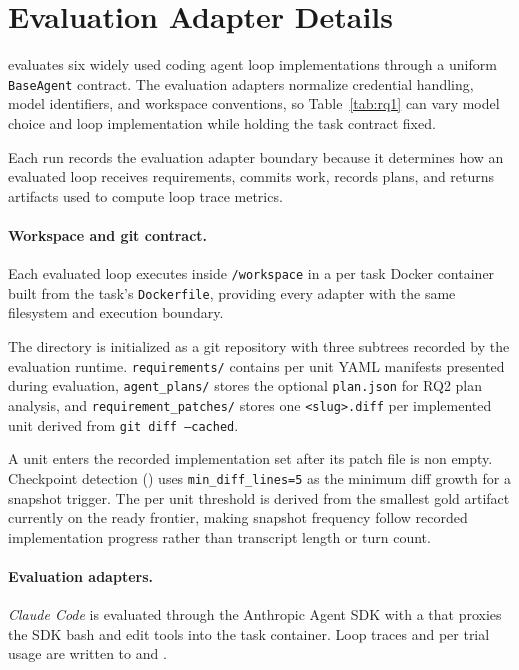 \section{Evaluation Adapter Details}\label{app:adaptations}

\lhb{} evaluates six widely used coding agent loop implementations through a uniform \texttt{BaseAgent} contract. The evaluation adapters normalize credential handling, model identifiers, and workspace conventions, so Table~\ref{tab:rq1} can vary model choice and loop implementation while holding the task contract fixed.

Each run records the evaluation adapter boundary because it determines how an evaluated loop receives requirements, commits work, records plans, and returns artifacts used to compute loop trace metrics.

\paragraph{Workspace and git contract.}

Each evaluated loop executes inside \texttt{/workspace} in a per task Docker container built from the task's \texttt{Dockerfile}, providing every adapter with the same filesystem and execution boundary.

The directory is initialized as a git repository with three subtrees recorded by the evaluation runtime. \texttt{requirements/} contains per unit YAML manifests presented during evaluation, \texttt{agent\_plans/} stores the optional \texttt{plan.json} for RQ2 plan analysis, and \texttt{requirement\_patches/} stores one \texttt{<slug>.diff} per implemented unit derived from \texttt{git diff --cached}.

A unit enters the recorded implementation set after its patch file is non empty. Checkpoint detection () uses \texttt{min\_diff\_lines=5} as the minimum diff growth for a snapshot trigger. The per unit threshold is derived from the smallest gold artifact currently on the ready frontier, making snapshot frequency follow recorded implementation progress rather than transcript length or turn count.

\paragraph{Evaluation adapters.}

\textit{Claude Code} is evaluated through the Anthropic Agent SDK with a  that proxies the SDK bash and edit tools into the task container. Loop traces and per trial usage are written to  and .

